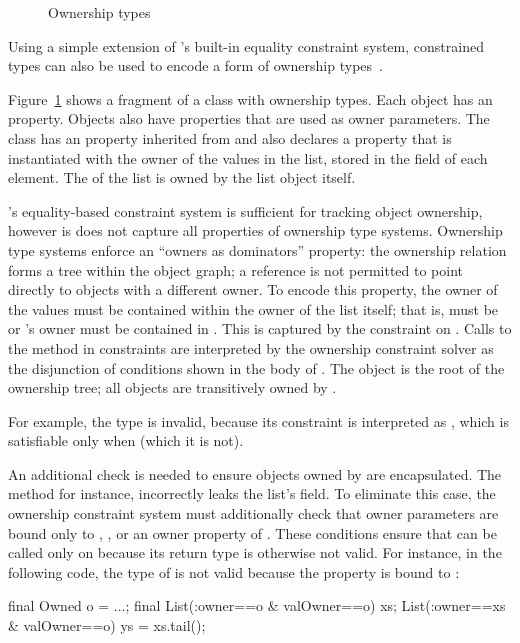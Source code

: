 \begin{figure}[t]
\caption{Ownership types}
\label{fig:ownership}
\end{figure}

Using a simple extension of \Xten{}'s built-in equality
constraint system,
constrained types can also be used to encode a form of ownership
types~\cite{ownership-types,liskov-popl2003}.

Figure~\ref{fig:ownership} shows a fragment of a 
class with ownership types.
Each  object has an  property.  Objects
also have properties that are used as owner parameters.
%
The  class has an  property inherited from
 and also declares a  property that is
instantiated with the owner of the values in the list, stored in
the  field of each element.  The  of the
list is owned by the list object itself.

\Xten{}'s equality-based constraint system is sufficient for
tracking object ownership, however is does not capture all
properties of ownership type systems.
Ownership type systems enforce an ``owners as dominators''
property: the ownership relation forms a tree within the object
graph; a reference is not permitted to point directly to objects
with a different owner.
%
To encode this property, the owner of
the values  must be contained within the owner
of the list itself; that is,  must be 
or 's owner must be contained in .
This is captured by the constraint  on
.  Calls to the  method in constraints
are interpreted by the ownership constraint solver as the
disjunction of conditions shown in the body of .
The object  is the root of the ownership tree; 
all objects are transitively owned by .

For example, the type 
is invalid, because
its constraint is interpreted as
,
which is satisfiable only when  (which it is not).

An additional check is needed to ensure objects owned by
 are encapsulated.
The  method for instance, incorrectly leaks the
list's  field.  To eliminate this case, the ownership
constraint system must additionally check that owner parameters
are bound only to 
, , or an owner property of .
These conditions ensure that  can be called only on
 because its return type is otherwise not valid.
For instance, in the following code, the type of  is
not valid because the  property is bound to :
\begin{xten}
    final Owned o = ...;
    final List(:owner==o & valOwner==o) xs;
    List(:owner==xs & valOwner==o) ys = xs.tail();
\end{xten}

